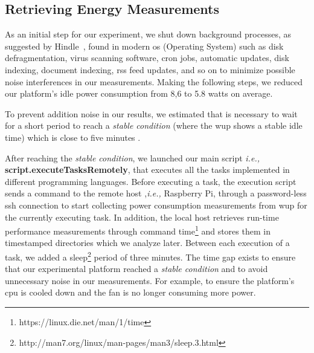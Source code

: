 \subsection{Retrieving Energy Measurements} 
As an initial step for our experiment, we shut down background 
processes, as suggested by Hindle~, 
found in modern {\sc os} (Operating System) such as disk defragmentation, virus 
scanning software, {\sc cron} jobs, automatic updates, 
disk indexing, document indexing, {\sc rss} feed updates, and so on to 
minimize possible noise interferences in our measurements. 
Making the following steps, we reduced our platform's idle 
power consumption from 8,6 to 5.8 watts on average. 

To prevent addition noise in our results, we estimated that is 
necessary to wait for a short period to reach a 
\textit{stable condition} (where the {\sc wup} shows a stable 
idle time) which is close to five minutes \cite{carroll_analysis_2010}.


After reaching the \textit{stable condition}, we launched our main 
script \textit{i.e.,} \textbf{script.executeTasksRemotely}, 
that executes all the tasks implemented in different programming 
languages. 
Before executing a task, the execution script sends a command 
to the remote host ,\textit{i.e.,} Raspberry Pi, through a 
password-less {\sc ssh} connection to start 
collecting power consumption measurements from {\sc wup} 
for the currently executing task. 
In addition, the local host retrieves run-time performance 
measurements through command 
time\footnote{https://linux.die.net/man/1/time} and stores them 
in timestamped directories which we analyze later.
Between each execution of a task, we added a 
sleep\footnote{http://man7.org/linux/man-pages/man3/sleep.3.html} 
period of three minutes. 
The time gap exists to ensure that our experimental platform 
reached a \textit{stable condition} and to avoid unnecessary noise 
in our measurements. 
For example, to ensure the platform's {\sc cpu} is cooled down 
and the fan is no longer consuming more power.


